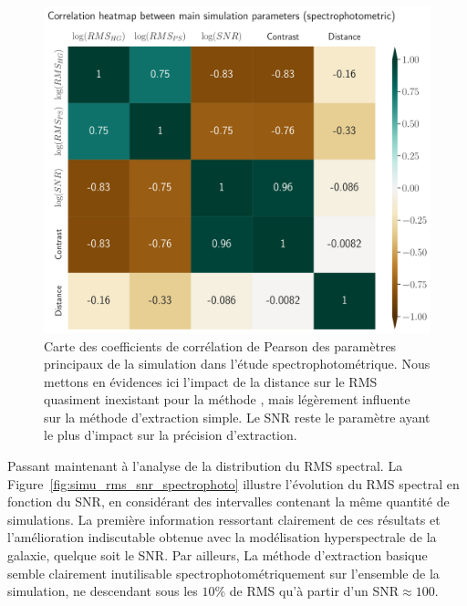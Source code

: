\documentclass[../main/main.tex]{subfiles}
\begin{document}
\begin{figure}[ht]
  \begin{minipage}[c]{0.6\textwidth}
    \includegraphics[width=\textwidth]{../figures/08_simu/corrheatmap_simu_params_spectrophoto.pdf}
  \end{minipage}\hfill
  \begin{minipage}[c]{0.38\textwidth}
    \caption[Corrélation des paramètres de la
    simulation (spectrophotométrique).]{Carte des coefficients de corrélation de Pearson des
      paramètres principaux de la
    simulation dans l'étude spectrophotométrique. Nous mettons en évidences ici l'impact de la distance
    sur le RMS quasiment inexistant pour la méthode \hypergal, mais
    légèrement influente sur la méthode d'extraction simple. Le SNR
    reste le paramètre ayant le plus d'impact sur la précision d'extraction.}\label{fig:corrheatmap_simuparams_spectrophoto}
  \end{minipage}
\end{figure}


Passant maintenant à l'analyse de la distribution du RMS spectral.
La Figure~\ref{fig:simu_rms_snr_spectrophoto} illustre l'évolution du
RMS spectral en fonction du SNR, en considérant des intervalles
contenant la même quantité de simulations.
La première information ressortant clairement de ces résultats et
l'amélioration indiscutable obtenue avec la modélisation hyperspectrale
de la galaxie, quelque soit le SNR. Par ailleurs, La méthode d'extraction basique
semble clairement inutilisable spectrophotométriquement sur l'ensemble
de la simulation, ne descendant sous les $10\%$ de RMS qu'à partir d'un
SNR$\approx100$.
\end{document}
